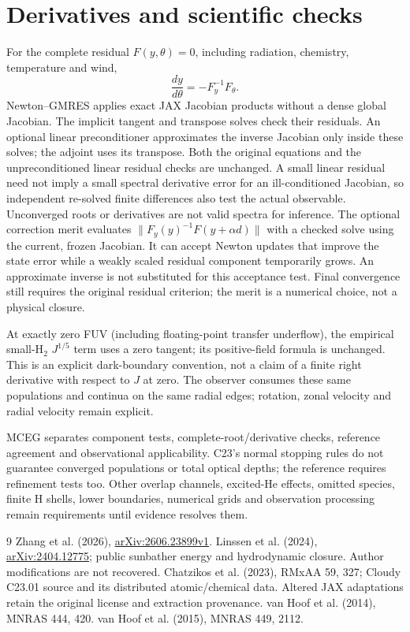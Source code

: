 \documentclass[10pt,a4paper]{article}
\begin{document}
\section{Derivatives and scientific checks}
For the complete residual $F(y,\theta)=0$, including radiation, chemistry,
temperature and wind,
\begin{equation}
 \frac{dy}{d\theta}=-F_y^{-1}F_\theta.\label{eq:implicit}
\end{equation}
Newton--GMRES applies exact JAX Jacobian products without a dense global
Jacobian. The implicit tangent and transpose solves check their residuals.
An optional linear preconditioner approximates the inverse Jacobian only
inside these solves; the adjoint uses its transpose. Both the original
equations and the unpreconditioned linear residual checks are unchanged.
A small linear residual need not imply a small spectral derivative error
for an ill-conditioned Jacobian, so independent re-solved finite differences
also test the actual observable.
Unconverged roots or derivatives are not valid spectra for inference.
The optional correction merit evaluates $\|F_y(y)^{-1}F(y+\alpha d)\|$
with a checked solve using the current, frozen Jacobian. It can accept
Newton updates that improve the state error while a weakly scaled residual
component temporarily grows. An approximate inverse is not substituted
for this acceptance test. Final convergence still requires the original
residual criterion; the merit is a numerical choice, not a physical closure.

At exactly zero FUV (including floating-point transfer underflow), the
empirical small-H$_2$ $J^{1/5}$ term uses a zero tangent; its positive-field
formula is unchanged. This is an explicit dark-boundary convention, not a
claim of a finite right derivative with respect to $J$ at zero.
The observer consumes these same populations and continua on the same
radial edges; rotation, zonal velocity and radial velocity remain explicit.

MCEG separates component tests, complete-root/derivative checks, reference
agreement and observational applicability. C23's normal stopping rules do
not guarantee converged populations or total optical depths; the reference
requires refinement tests too. Other overlap channels, excited-He effects,
omitted species, finite H shells, lower boundaries, numerical grids and
observation processing remain requirements until evidence resolves them.

\begin{thebibliography}{9}
 Zhang et al. (2026),
\href{https://arxiv.org/abs/2606.23899v1}{arXiv:2606.23899v1}.
 Linssen et al. (2024),
\href{https://arxiv.org/abs/2404.12775}{arXiv:2404.12775}; public sunbather
energy and hydrodynamic closure. Author modifications are not recovered.
 Chatzikos et al. (2023), RMxAA 59, 327; Cloudy C23.01
source and its distributed atomic/chemical data. Altered JAX adaptations
retain the original license and extraction provenance.
 van Hoof et al. (2014), MNRAS 444, 420.
 van Hoof et al. (2015), MNRAS 449, 2112.
\end{thebibliography}
\end{document}
